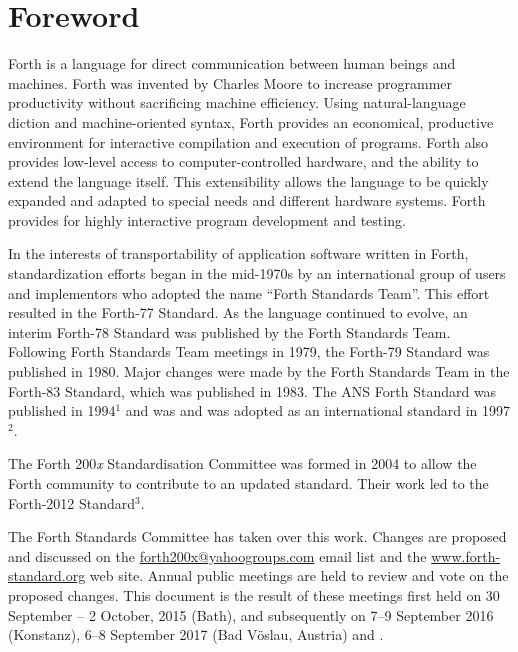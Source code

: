 
\vspace*{-6ex}\chapter*{Foreword}
\label{foreword}

Forth is a language for direct communication between human beings and
machines. Forth was invented by Charles Moore to increase programmer
productivity without sacrificing machine efficiency.
Using natural-language diction and machine-oriented syntax,
Forth provides an economical, productive environment for interactive
compilation and execution of programs. Forth also provides low-level
access to computer-controlled hardware, and the ability to extend the
language itself. This extensibility allows the language to be quickly
expanded and adapted to special needs and different hardware systems.
Forth provides for highly interactive program development and testing.

In the interests of transportability of application software written in
Forth, standardization efforts began in the mid-1970s by an international
group of users and implementors who adopted the name ``Forth Standards Team''.
This effort resulted in the Forth-77 Standard. As the language continued
to evolve, an interim Forth-78 Standard was published by the Forth Standards
Team. Following Forth Standards Team meetings in 1979, the Forth-79 Standard
was published in 1980. Major changes were made by the Forth Standards Team
in the Forth-83 Standard, which was published in 1983.
The ANS Forth Standard was published in 1994$^1$ and was
and was adopted as an international standard in 1997$^2$.





The Forth 200\emph{x} Standardisation Committee was formed in 2004
to allow the Forth community to contribute to an updated standard.
Their work led to the Forth-2012 Standard$^3$.

The Forth Standards Committee has taken over this work.  
Changes are proposed and discussed on the
\href{email:forth200x@yahoogroups.com}{forth200x@yahoogroups.com}
email list and the \href{href://www.forth-standard.org/}{www.forth-standard.org}
web site.
Annual public meetings are held to review and vote on the proposed changes.
This document is the result of these meetings first held on
30 September -- 2 October, 2015 (Bath), and subsequently on
7--9 September 2016 (Konstanz),
6--8 September 2017 (Bad V\"oslau, Austria)
and 
.
